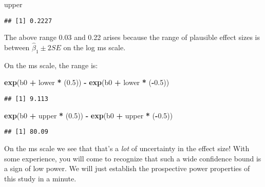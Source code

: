 \documentclass[12pt,]{krantz}
\newenvironment{Shaded}{\begin{snugshade}}{\end{snugshade}}
\newcommand{\FloatTok}[1]{\textcolor[rgb]{0.00,0.00,0.81}{#1}}
\newcommand{\KeywordTok}[1]{\textcolor[rgb]{0.13,0.29,0.53}{\textbf{#1}}}
\newcommand{\NormalTok}[1]{#1}
\newcommand{\OperatorTok}[1]{\textcolor[rgb]{0.81,0.36,0.00}{\textbf{#1}}}
\newcommand{\StringTok}[1]{\textcolor[rgb]{0.31,0.60,0.02}{#1}}
\begin{document}
\begin{Shaded}
\begin{Highlighting}[]
\NormalTok{upper}
\end{Highlighting}
\end{Shaded}

\begin{verbatim}
## [1] 0.2227
\end{verbatim}

The above range 0.03 and 0.22 arises because the range of plausible effect sizes is between \(\hat\beta_1 \pm 2SE\) on the log ms scale.

On the ms scale, the range is:

\begin{Shaded}
\begin{Highlighting}[]
\KeywordTok{exp}\NormalTok{(b0 }\OperatorTok{+}\StringTok{ }\NormalTok{lower }\OperatorTok{*}\StringTok{ }\NormalTok{(}\FloatTok{0.5}\NormalTok{)) }\OperatorTok{-}\StringTok{ }\KeywordTok{exp}\NormalTok{(b0 }\OperatorTok{+}\StringTok{ }\NormalTok{lower }\OperatorTok{*}\StringTok{ }
\StringTok{  }\NormalTok{(}\OperatorTok{-}\FloatTok{0.5}\NormalTok{))}
\end{Highlighting}
\end{Shaded}

\begin{verbatim}
## [1] 9.113
\end{verbatim}

\begin{Shaded}
\begin{Highlighting}[]
\KeywordTok{exp}\NormalTok{(b0 }\OperatorTok{+}\StringTok{ }\NormalTok{upper }\OperatorTok{*}\StringTok{ }\NormalTok{(}\FloatTok{0.5}\NormalTok{)) }\OperatorTok{-}\StringTok{ }\KeywordTok{exp}\NormalTok{(b0 }\OperatorTok{+}\StringTok{ }\NormalTok{upper }\OperatorTok{*}\StringTok{ }
\StringTok{  }\NormalTok{(}\OperatorTok{-}\FloatTok{0.5}\NormalTok{))}
\end{Highlighting}
\end{Shaded}

\begin{verbatim}
## [1] 80.09
\end{verbatim}

On the ms scale we see that that's a \emph{lot} of uncertainty in the effect size! With some experience, you will come to recognize that such a wide confidence bound is a sign of low power. We will just establish the prospective power properties of this study in a minute.
\end{document}
